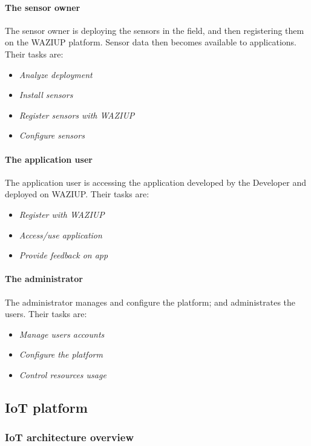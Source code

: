 \paragraph{The sensor owner }
The sensor owner is deploying the sensors in the field, and then registering them on the WAZIUP platform. Sensor data then becomes available to applications. Their tasks are:
\begin{itemize}
	\item \emph{Analyze deployment}
	\item \emph{Install sensors}
	\item \emph{Register sensors with WAZIUP}
	\item \emph{Configure sensors }
\end{itemize}

\paragraph{The application user}
The application user is accessing the application developed by the Developer and deployed on WAZIUP. Their tasks are:
\begin{itemize}
	\item \emph{Register with WAZIUP}
	\item \emph{Access/use application}
	\item \emph{Provide feedback on app}
\end{itemize}

\paragraph{The administrator}
The administrator manages and configure the platform; and administrates the users. Their tasks are:
\begin{itemize}
	\item \emph{Manage users accounts}
	\item \emph{Configure the platform}
	\item \emph{Control resources usage}
\end{itemize}

\subsection{IoT platform}

\subsubsection{IoT architecture overview}

